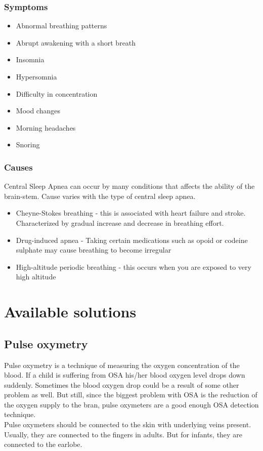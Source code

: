 \documentclass{report}
\begin{document}
\subsubsection{Symptoms}

\begin{itemize}
\item Abnormal breathing patterns
\item Abrupt awakening with a short breath
\item Insomnia
\item Hypersomnia
\item Difficulty in concentration
\item Mood changes 
\item Morning headaches
\item Snoring
\end{itemize}




\subsubsection{Causes}

Central Sleep Apnea can occur by many conditions that affects the ability of the brain-stem. Cause varies with the type of central sleep apnea.

\begin{itemize}
    \item Cheyne-Stokes breathing - this is associated with heart failure and stroke. Characterized by gradual increase and decrease in breathing effort.
    
    \item Drug-induced apnea - Taking certain medications such as opoid or codeine sulphate may cause breathing to become irregular

    \item High-altitude periodic breathing - this occurs when you are exposed to very high altitude
\end{itemize}    





\section{Available solutions}

\subsection{Pulse oxymetry}
{Pulse oxymetry is a technique of measuring the oxygen concentration of the blood. If a child is suffering from OSA his/her blood oxygen level drops down suddenly. Sometimes the blood oxygen drop could be a result of some other problem as well. But still, since the biggest problem with OSA is the reduction of the oxygen supply to the bran, pulse oxymeters are a good enough OSA detection technique.}\\
{Pulse oxymeters should be connected to the skin with underlying veins present. Usually, they are connected to the fingers in adults. But for infants, they are connected to the earlobe.}
\end{document}
